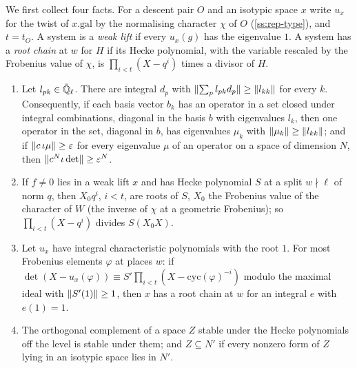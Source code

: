 We first collect four facts. For a descent pair $O$ and an isotypic space $x$ write $u_x$ for the twist of $x.\mathrm{gal}$ by the normalising character $\chi$ of $O$ (\cref{ss:rep-type}), and $t=t_O$. A system is a \emph{weak lift} if every $u_x(g)$ has the eigenvalue $1$.
A system has a \emph{root chain} at $w$ for $H$ if its Hecke polynomial, with the variable rescaled by the Frobenius value of $\chi$, is $\prod_{i<t}(X-q^i)$ times a divisor of $H$.

\begin{lemma}\label{lem:root-chains}
\begin{enumerate}[label=\textup{(\alph*)}]
\item Let $l_{pk}\in\bar{\mathbb{Q}}_\ell$. There are integral $d_p$ with $\lVert \sum_pl_{pk}d_p\rVert\ge\lVert l_{kk}\rVert$ for every $k$. Consequently, if each basis vector $b_k$ has an operator in a set closed under integral combinations, diagonal in the basis $b$ with
eigenvalues $l_k$, then one operator in the set, diagonal in $b$, has eigenvalues $\mu_k$ with $\lVert \mu_k\rVert\ge\lVert l_{kk}\rVert$; and if $\lVert c\,\iota\mu\rVert\ge\varepsilon$ for every eigenvalue $\mu$ of an operator on a space of dimension $N$, then
$\lVert c^N\iota\det\rVert\ge\varepsilon^N$.
\item If $f\ne0$ lies in a weak lift $x$ and has Hecke polynomial $S$ at a split $w\nmid\ell$ of norm $q$, then $X_0q^i$, $i<t$, are roots of $S$, $X_0$ the Frobenius value of the character of $W$ (the inverse of $\chi$ at a geometric Frobenius);
so $\prod_{i<t}(X-q^i)$ divides $S(X_0X)$.
\item Let $u_x$ have integral characteristic polynomials with the root $1$. For most Frobenius elements $\varphi$ at places $w$: if $\det(X-u_x(\varphi))\equiv S'\prod_{i<t}(X-\mathrm{cyc}(\varphi)^{-i})$ modulo the maximal ideal with $\lVert S'(1)\rVert\ge1$, then $x$ has a root chain at $w$
for an integral $e$ with $e(1)=1$.
\item The orthogonal complement of a space $Z$ stable under the Hecke polynomials off the level is stable under them; and $Z\subseteq N'$ if every nonzero form of $Z$ lying in an isotypic space lies in $N'$.
\end{enumerate}
\end{lemma}

